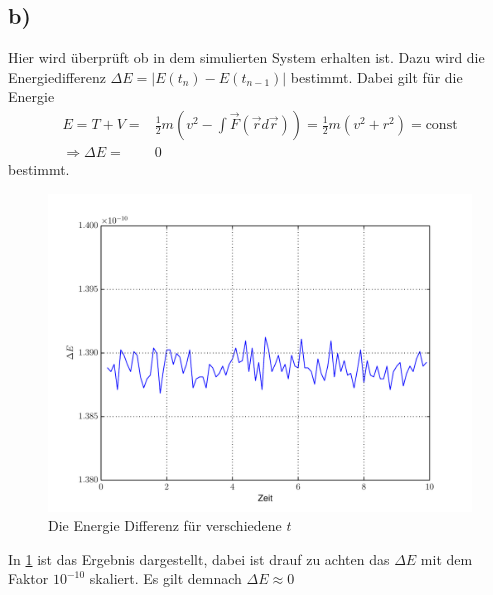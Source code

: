\subsection*{b)}
Hier wird überprüft ob in dem simulierten System erhalten ist.
Dazu wird die Energiedifferenz $\Delta E= |E(t_n)-E(t_{n-1})|$ bestimmt.
Dabei gilt für die Energie
\begin{align}
	E = T + V =& \frac{1}{2}m\left( v^2 - \int \vec{F}(\vec{r} d\vec{r}) \right) =\frac{1}{2}m\left( v^2 + r^2 \right) = \text{const}\\
	\Rightarrow \Delta E =& 0
\end{align}
bestimmt.\\
\begin{figure}
	\centering
	\includegraphics[width = \textwidth]{../Plots/Plot_2_B_Energie.pdf}
	\caption{Die Energie Differenz für verschiedene $t$\label{fig:EnergieDiff}}
\end{figure}
In \cref{fig:EnergieDiff} ist das Ergebnis dargestellt, dabei ist drauf zu achten das $\Delta E$ mit dem Faktor $10^{-10}$ skaliert.
Es gilt demnach $\Delta E\approx 0$